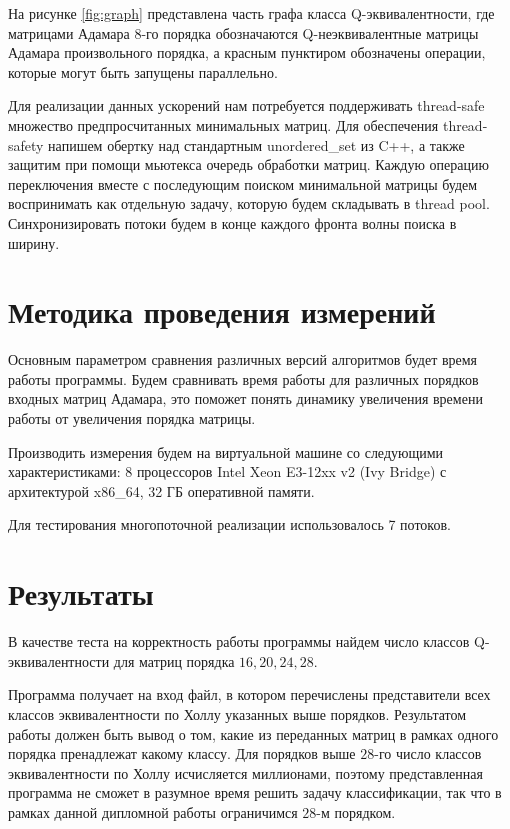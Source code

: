 На рисунке \ref{fig:graph} представлена часть графа класса Q-эквивалентности, где матрицами Адамара 8-го порядка обозначаются Q-неэквивалентные матрицы Адамара произвольного порядка, а красным пунктиром обозначены операции, которые могут быть запущены параллельно.

Для реализации данных ускорений нам потребуется поддерживать thread-safe множество предпросчитанных минимальных матриц. Для обеспечения thread-safety напишем обертку над стандартным unordered\_set из C++, а также защитим при помощи мьютекса очередь обработки матриц. Каждую операцию переключения вместе с последующим поиском минимальной матрицы будем воспринимать как отдельную задачу, которую будем складывать в thread pool. Синхронизировать потоки будем в конце каждого фронта волны поиска в ширину.

\section{Методика проведения измерений}

Основным параметром сравнения различных версий алгоритмов будет время работы программы. Будем сравнивать время работы для различных порядков входных матриц Адамара, это поможет понять динамику увеличения времени работы от увеличения порядка матрицы.

Производить измерения будем на виртуальной машине со следующими характеристиками: 8 процессоров Intel Xeon E3-12xx v2 (Ivy Bridge) с архитектурой x86\_64, 32 ГБ оперативной памяти.

Для тестирования многопоточной реализации использовалось 7 потоков.

\section{Результаты}

В качестве теста на корректность работы программы найдем число классов Q-эквивалентности для матриц порядка $16, 20, 24, 28$.

Программа получает на вход файл, в котором перечислены представители всех классов эквивалентности по Холлу указанных выше порядков. Результатом работы должен быть вывод о том, какие из переданных матриц в рамках одного порядка пренадлежат какому классу. Для порядков выше $28$-го число классов эквивалентности по Холлу исчисляется миллионами, поэтому представленная программа не сможет в разумное время решить задачу классификации, так что в рамках данной дипломной работы ограничимся $28$-м порядком.

